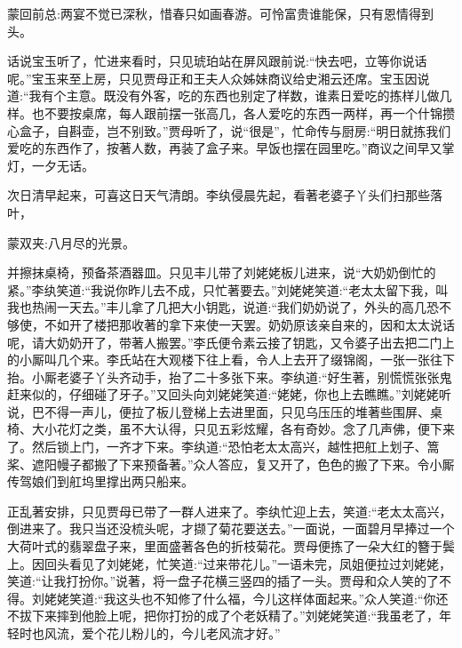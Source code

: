 

\begin{parag}
    \begin{note}蒙回前总:两宴不觉已深秋，惜春只如画春游。可怜富贵谁能保，只有恩情得到头。\end{note}
\end{parag}


\begin{parag}
    话说宝玉听了，忙进来看时，只见琥珀站在屏风跟前说:“快去吧，立等你说话呢。”宝玉来至上房，只见贾母正和王夫人众姊妹商议给史湘云还席。宝玉因说道:“我有个主意。既没有外客，吃的东西也别定了样数，谁素日爱吃的拣样儿做几样。也不要按桌席，每人跟前摆一张高几，各人爱吃的东西一两样，再一个什锦攒心盒子，自斟壶，岂不别致。”贾母听了，说“很是”，忙命传与厨房:“明日就拣我们爱吃的东西作了，按著人数，再装了盒子来。早饭也摆在园里吃。”商议之间早又掌灯，一夕无话。
\end{parag}


\begin{parag}
    次日清早起来，可喜这日天气清朗。李纨侵晨先起，看著老婆子丫头们扫那些落叶，\begin{note}蒙双夹:八月尽的光景。\end{note}并擦抹桌椅，预备茶酒器皿。只见丰儿带了刘姥姥板儿进来，说“大奶奶倒忙的紧。”李纨笑道:“我说你昨儿去不成，只忙著要去。”刘姥姥笑道:“老太太留下我，叫我也热闹一天去。”丰儿拿了几把大小钥匙，说道:“我们奶奶说了，外头的高几恐不够使，不如开了楼把那收著的拿下来使一天罢。奶奶原该亲自来的，因和太太说话呢，请大奶奶开了，带著人搬罢。”李氏便令素云接了钥匙，又令婆子出去把二门上的小厮叫几个来。李氏站在大观楼下往上看，令人上去开了缀锦阁，一张一张往下抬。小厮老婆子丫头齐动手，抬了二十多张下来。李纨道:“好生著，别慌慌张张鬼赶来似的，仔细碰了牙子。”又回头向刘姥姥笑道:“姥姥，你也上去瞧瞧。”刘姥姥听说，巴不得一声儿，便拉了板儿登梯上去进里面，只见乌压压的堆著些围屏、桌椅、大小花灯之类，虽不大认得，只见五彩炫耀，各有奇妙。念了几声佛，便下来了。然后锁上门，一齐才下来。李纨道:“恐怕老太太高兴，越性把舡上划子、篙桨、遮阳幔子都搬了下来预备著。”众人答应，复又开了，色色的搬了下来。令小厮传驾娘们到舡坞里撑出两只船来。
\end{parag}


\begin{parag}
    正乱著安排，只见贾母已带了一群人进来了。李纨忙迎上去，笑道:“老太太高兴，倒进来了。我只当还没梳头呢，才撷了菊花要送去。”一面说，一面碧月早捧过一个大荷叶式的翡翠盘子来，里面盛著各色的折枝菊花。贾母便拣了一朵大红的簪于鬓上。因回头看见了刘姥姥，忙笑道:“过来带花儿。”一语未完，凤姐便拉过刘姥姥，笑道:“让我打扮你。”说著，将一盘子花横三竖四的插了一头。贾母和众人笑的了不得。刘姥姥笑道:“我这头也不知修了什么福，今儿这样体面起来。”众人笑道:“你还不拔下来摔到他脸上呢，把你打扮的成了个老妖精了。”刘姥姥笑道:“我虽老了，年轻时也风流，爱个花儿粉儿的，今儿老风流才好。”
\end{parag}


